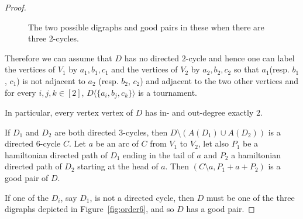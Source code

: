 \documentclass{article}
\theoremstyle{definition}
\newcommand{\2}{\vspace{0.2cm}}
\begin{document}
\begin{proof}
\begin{figure}[H]
\begin{center}
\caption{The two possible digraphs and good pairs in these when there
  are three 2-cycles.}\label{fig:6vertex}
\end{center}
\end{figure}
Therefore we can assume that $D$ has no directed $2$-cycle and hence one can
label the vertices of $V_1$ by $a_1, b_1, c_1$ and the vertices of
$V_2$ by $a_2, b_2, c_2$ so that $a_1$(resp. $b_1$, $c_1$) is not
adjacent to $a_2$ (resp. $b_2$, $c_2$) and adjacent to the two other
vertices and for every $i, j, k\in [2]$, $D\langle \{a_i, b_{j},
c_{k}\}\rangle$ is a tournament.

In particular, every vertex vertex of $D$ has in- and out-degree exactly $2$.
 
 If $D_1$ and $D_2$ are both directed $3$-cycles, then $D\setminus
 (A(D_1)\cup A(D_2))$ is a directed $6$-cycle $C$.  Let $a$ be an arc
 of $C$ from $V_1$ to $V_2$, let also $P_1$ be a hamiltonian directed
 path of $D_1$ ending in the tail of $a$ and $P_2$ a hamiltonian
 directed path of $D_2$ starting at the head of $a$. Then $(C\setminus a, P_1+
 a + P_2)$ is a good pair of $D$.

 If one of the $D_i$, say $D_1$, is not a directed cycle, then $D$
 must be one of the three digraphs depicted in
 Figure~\ref{fig:order6}, and so $D$ has a good pair.
 \end{proof}
\end{document}
